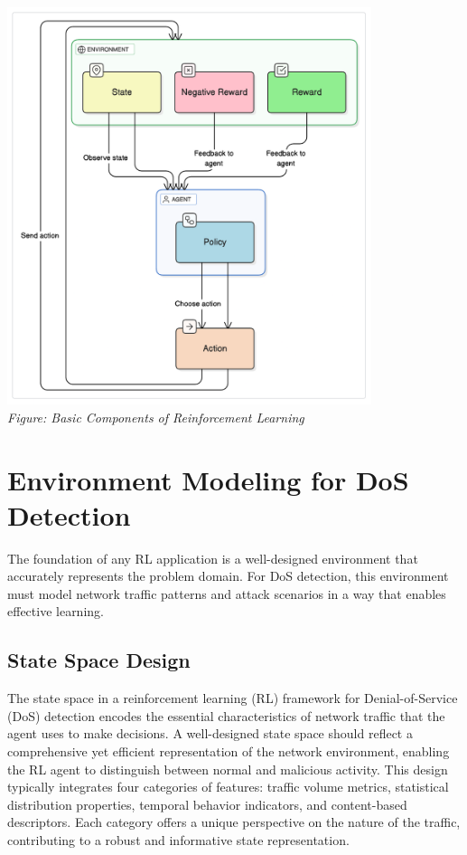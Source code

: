 \documentclass{report}
\begin{document}
 \begin{center}
    \includegraphics[width=0.8\textwidth]{images/rl-diagram.png} \\
    \textit{Figure: Basic Components of Reinforcement Learning}
  \end{center}

\section{Environment Modeling for DoS Detection}

The foundation of any RL application is a well-designed environment that accurately represents the problem domain. For DoS detection, this environment must model network traffic patterns and attack scenarios in a way that enables effective learning.

\subsection{State Space Design}

The state space in a reinforcement learning (RL) framework for Denial-of-Service (DoS) detection encodes the essential characteristics of network traffic that the agent uses to make decisions. A well-designed state space should reflect a comprehensive yet efficient representation of the network environment, enabling the RL agent to distinguish between normal and malicious activity. This design typically integrates four categories of features: traffic volume metrics, statistical distribution properties, temporal behavior indicators, and content-based descriptors. Each category offers a unique perspective on the nature of the traffic, contributing to a robust and informative state representation.
\end{document}
